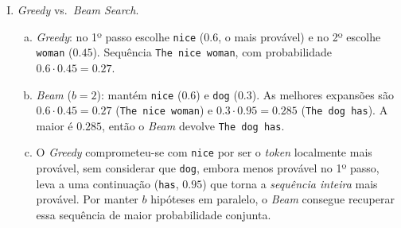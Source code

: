 \documentclass{dlproblemset}
\begin{document}
\begin{enumerate}[I)]
\item \textit{Greedy} vs.\ \textit{Beam Search}.
\begin{enumerate}[(a)]
    \item \textit{Greedy}: no 1º passo escolhe \texttt{nice} ($0.6$, o mais provável) e no 2º
    escolhe \texttt{woman} ($0.45$). Sequência \texttt{The nice woman}, com probabilidade
    $0.6 \cdot 0.45 = 0.27$.
    \item \textit{Beam} ($b = 2$): mantém \texttt{nice} ($0.6$) e \texttt{dog} ($0.3$). As
    melhores expansões são $0.6 \cdot 0.45 = 0.27$ (\texttt{The nice woman}) e
    $0.3 \cdot 0.95 = 0.285$ (\texttt{The dog has}). A maior é $0.285$, então o
    \textit{Beam} devolve \texttt{The dog has}.
    \item O \textit{Greedy} comprometeu-se com \texttt{nice} por ser o \textit{token} localmente
    mais provável, sem considerar que \texttt{dog}, embora menos provável no 1º passo, leva a uma
    continuação (\texttt{has}, $0.95$) que torna a \emph{sequência inteira} mais provável. Por
    manter $b$ hipóteses em paralelo, o \textit{Beam} consegue recuperar essa sequência de maior
    probabilidade conjunta.
\end{enumerate}


\end{enumerate}
\end{document}
